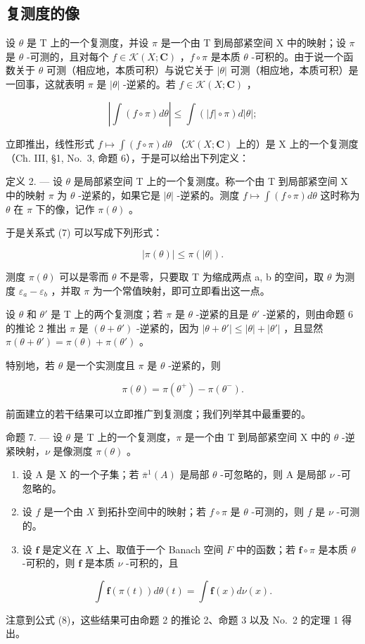 \subsection{复测度的像}

设 \(\theta\) 是 T 上的一个复测度，并设 \(\pi\) 是一个由 T 到局部紧空间 X 中的映射；设 \(\pi\) 是 \(\theta\) -可测的，且对每个 \(f \in \mathcal{K}(X; \mathbf{C})\) ，\(f \circ \pi\) 是本质 \(\theta\) -可积的。由于说一个函数关于 \(\theta\) 可测（相应地，本质可积）与说它关于 \(|\theta|\) 可测（相应地，本质可积）是一回事，这就表明 \(\pi\) 是 \(|\theta|\) -逆紧的。若 \(f \in \mathcal{K}(X; \mathbf{C})\) ，

\[
\left| \int (f \circ \pi) d \theta \right| \leqslant \int (| f | \circ \pi) d | \theta |;\tag{7}
\]

立即推出，线性形式 \(f \mapsto \int(f \circ \pi) d\theta\) （\(\mathcal{K}(X; \mathbf{C})\) 上的）是 X 上的一个复测度（Ch. III, §1, No.~3, 命题 6），于是可以给出下列定义：

定义 2. --- 设 \(\theta\) 是局部紧空间 T 上的一个复测度。称一个由 T 到局部紧空间 X 中的映射 \(\pi\) 为 \(\theta\) -逆紧的，如果它是 \(|\theta|\) -逆紧的。测度 \(f \mapsto \int(f \circ \pi) d\theta\) 这时称为 \(\theta\) 在 \(\pi\) 下的像，记作 \(\pi(\theta)\) 。

于是关系式 (7) 可以写成下列形式：

\[
| \pi (\theta) | \leqslant \pi (| \theta |).\tag{8}
\]

测度 \(\pi(\theta)\) 可以是零而 \(\theta\) 不是零，只要取 T 为缩成两点 a, b 的空间，取 \(\theta\) 为测度 \(\varepsilon_{a} - \varepsilon_{b}\) ，并取 \(\pi\) 为一个常值映射，即可立即看出这一点。

设 \(\theta\) 和 \(\theta'\) 是 T 上的两个复测度；若 \(\pi\) 是 \(\theta\) -逆紧的且是 \(\theta'\) -逆紧的，则由命题 6 的推论 2 推出 \(\pi\) 是 \((\theta + \theta')\) -逆紧的，因为 \(|\theta + \theta'| \leqslant |\theta| + |\theta'|\) ，且显然 \(\pi(\theta + \theta') = \pi(\theta) + \pi(\theta')\) 。

特别地，若 \(\theta\) 是一个实测度且 \(\pi\) 是 \(\theta\) -逆紧的，则

\[
\pi (\theta) = \pi (\theta^ {+}) - \pi (\theta^ {-}).\tag{9}
\]

前面建立的若干结果可以立即推广到复测度；我们列举其中最重要的。

命题 7. --- 设 \(\theta\) 是 T 上的一个复测度，\(\pi\) 是一个由 T 到局部紧空间 X 中的 \(\theta\) -逆紧映射，\(\nu\) 是像测度 \(\pi(\theta)\) 。

\begin{enumerate}
\def\labelenumi{\alph{enumi})}
\item
  设 A 是 X 的一个子集；若 \(\overline{\pi}^{1}(A)\) 是局部 \(\theta\) -可忽略的，则 A 是局部 \(\nu\) -可忽略的。
\item
  设 \(f\) 是一个由 \(X\) 到拓扑空间中的映射；若 \(f \circ \pi\) 是 \(\theta\) -可测的，则 \(f\) 是 \(\nu\) -可测的。
\item
  设 \(\mathbf{f}\) 是定义在 \(X\) 上、取值于一个 Banach 空间 \(F\) 中的函数；若 \(\mathbf{f} \circ \pi\) 是本质 \(\theta\) -可积的，则 \(\mathbf{f}\) 是本质 \(\nu\) -可积的，且
\end{enumerate}

\[
\int \mathbf {f} (\pi (t)) d \theta (t) = \int \mathbf {f} (x) d \nu (x).\tag{10}
\]

注意到公式 (8)，这些结果可由命题 2 的推论 2、命题 3 以及 No.~2 的定理 1 得出。

